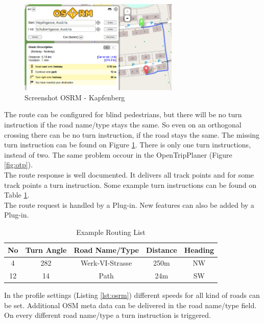 \documentclass{sig-alternate}
\begin{document}
\begin{figure}
\centering
\includegraphics[width=3in]{osrm-ss.png}
\caption{Screenshot OSRM - Kapfenberg}
\label{fig:osrm}
\end{figure}

The route can be configured for blind pedestrians, but there will be no turn instruction if the road name/type stays the same. So even on an orthogonal crossing there can be no turn instruction, if the road stays the same. 
The missing turn instruction can be found on Figure \ref{fig:osrm}. There is only one turn instructions, instead of two. The same problem occour in the OpenTripPlaner (Figure \ref{fig:otp}).\\
The route response is well documented. It delivers all track points and for some track points a turn instruction. Some example turn instructions can be found on Table \ref{tab:rlist}. \\
The route request is handled by a Plug-in. New features can also be added by a Plug-in.

 

\begin{table}
\centering
\caption{Example Routing List}
\begin{tabular}{|c|c|c|c|c|} \hline
No&Turn Angle&Road Name/Type&Distance&Heading\\ \hline \hline
4&282&Werk-VI-Strasse&250m&NW\\ \hline
12&14&Path&24m&SW\\ \hline
\end{tabular}
\label{tab:rlist}
\end{table}

In the profile settings (Listing \ref{lst:osrm}) different speeds for all kind of roads can be set. Additional OSM meta data can be delivered in the road name/type field. On every different road name/type a turn instruction is triggered. 



\end{document}
